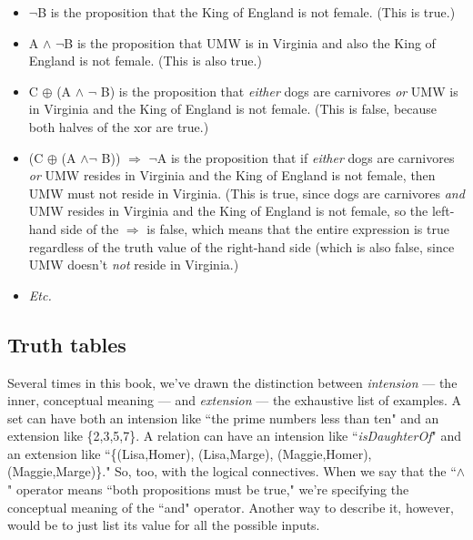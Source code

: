 \begin{itemize}
\item $\neg$B is the proposition that the King of England is not female.
(This is true.)
\item A $\wedge$ $\neg$B is the proposition that UMW is in Virginia and also
the King of England is not female. (This is also true.)
\item C $\oplus$ (A $\wedge$ $\neg$ B) is the proposition that \textit{either}
dogs are carnivores \textit{or} UMW is in Virginia and the King of England
is not female. (This is false, because both halves of the xor are true.)
\item (C $\oplus$ (A $\wedge \neg$ B)) $\Rightarrow$ $\neg$A is the
proposition that if \textit{either} dogs are carnivores \textit{or} UMW
resides in Virginia and the King of England is not female, then UMW must not
reside in Virginia. (This is true, since dogs are carnivores \textit{and}
UMW resides in Virginia and the King of England is not female, so the
left-hand side of the $\Rightarrow$ is false, which means that the entire
expression is true regardless of the truth value of the right-hand side
(which is also false, since UMW doesn't \textit{not} reside in Virginia.)
\item \textit{Etc.}

\end{itemize}

\pagebreak
\subsection{Truth tables}

Several times in this book, we've drawn the distinction between
\textit{intension} --- the inner, conceptual meaning --- and
\textit{extension} --- the exhaustive list of examples. A set can have both
an intension like ``the prime numbers less than ten" and an extension like
\{2,3,5,7\}. A relation can have an intension like ``\textsl{isDaughterOf}"
and an extension like ``\{(Lisa,Homer), (Lisa,Marge), (Maggie,Homer),
(Maggie,Marge)\}." So, too, with the logical connectives. When we say that
the ``$\wedge$" operator means ``both propositions must be true," we're
specifying the conceptual meaning of the ``and" operator. Another way to
describe it, however, would be to just list its value for all the possible
inputs.


